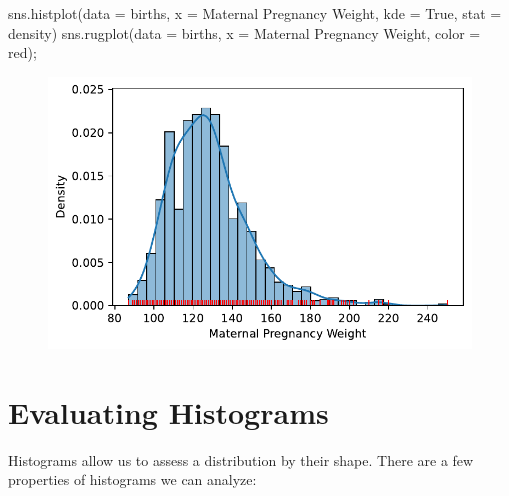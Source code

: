 \documentclass[
  letterpaper,
  DIV=11,
  numbers=noendperiod]{scrreprt}
\newenvironment{Shaded}{\begin{snugshade}}{\end{snugshade}}
\newcommand{\NormalTok}[1]{\textcolor[rgb]{0.00,0.23,0.31}{#1}}
\newcommand{\OperatorTok}[1]{\textcolor[rgb]{0.37,0.37,0.37}{#1}}
\newcommand{\StringTok}[1]{\textcolor[rgb]{0.13,0.47,0.30}{#1}}
\newcommand{\VariableTok}[1]{\textcolor[rgb]{0.07,0.07,0.07}{#1}}
\begin{document}
\begin{Shaded}
\begin{Highlighting}[]
\NormalTok{sns.histplot(data }\OperatorTok{=}\NormalTok{ births, x }\OperatorTok{=} \StringTok{\textquotesingle{}Maternal Pregnancy Weight\textquotesingle{}}\NormalTok{, kde }\OperatorTok{=} \VariableTok{True}\NormalTok{, }
\NormalTok{             stat }\OperatorTok{=} \StringTok{\textquotesingle{}density\textquotesingle{}}\NormalTok{)}
\NormalTok{sns.rugplot(data }\OperatorTok{=}\NormalTok{ births, x }\OperatorTok{=} \StringTok{\textquotesingle{}Maternal Pregnancy Weight\textquotesingle{}}\NormalTok{, color }\OperatorTok{=} \StringTok{\textquotesingle{}red\textquotesingle{}}\NormalTok{)}\OperatorTok{;}
\end{Highlighting}
\end{Shaded}

\begin{figure}[H]

{\centering \includegraphics{visualization_1/visualization_1_files/figure-pdf/cell-10-output-1.pdf}

}

\end{figure}

\hypertarget{evaluating-histograms}{%
\section{Evaluating Histograms}\label{evaluating-histograms}}

Histograms allow us to assess a distribution by their shape. There are a
few properties of histograms we can analyze:
\end{document}
